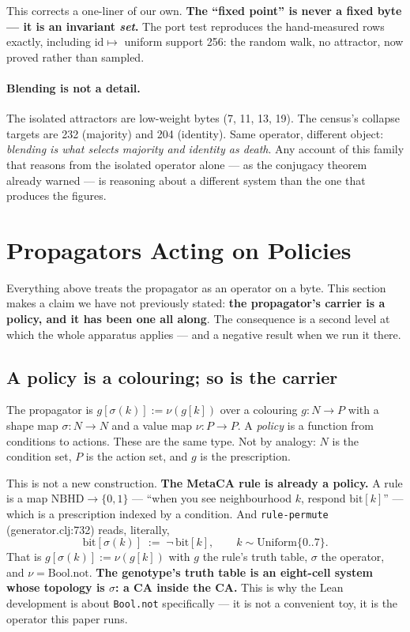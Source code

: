 \documentclass[man,12pt,floatsintext]{apa7}
\newcommand{\sig}{\sigma}
\newcommand{\bit}[1]{\mathrm{bit}[#1]}
\begin{document}
This corrects a one-liner of our own. \textbf{The ``fixed point'' is never
a fixed byte --- it is an invariant \emph{set}.} The port test reproduces
the hand-measured rows exactly, including $\mathrm{id} \mapsto$ uniform
support 256: the random walk, no attractor, now proved rather than
sampled.

\paragraph{Blending is not a detail.}
The isolated attractors are low-weight bytes (7, 11, 13, 19). The census's
collapse targets are 232 (majority) and 204 (identity). Same operator,
different object: \emph{blending is what selects majority and identity as
death}. Any account of this family that reasons from the isolated operator
alone --- as the conjugacy theorem already warned --- is reasoning about a
different system than the one that produces the figures.

\section{Propagators Acting on Policies}
\label{sec:policies}

Everything above treats the propagator as an operator on a byte. This section
makes a claim we have not previously stated: \textbf{the propagator's carrier is
a policy, and it has been one all along}. The consequence is a second level at
which the whole apparatus applies --- and a negative result when we run it there.

\subsection{A policy is a colouring; so is the carrier}

The propagator is $g[\sig(k)] := \nu(g[k])$ over a colouring $g : N \to P$ with a
shape map $\sig : N \to N$ and a value map $\nu : P \to P$. A \emph{policy} is a
function from conditions to actions. These are the same type. Not by analogy:
$N$ is the condition set, $P$ is the action set, and $g$ is the prescription.

This is not a new construction. \textbf{The MetaCA rule is already a policy.} A
rule is a map $\mathrm{NBHD} \to \{0,1\}$ --- ``when you see neighbourhood $k$,
respond $\bit{k}$'' --- which is a prescription indexed by a condition. And
\texttt{rule-permute} (generator.clj:732) reads, literally,
\[
  \bit{\sig(k)} \;:=\; \lnot\,\bit{k}, \qquad k \sim \mathrm{Uniform}\{0..7\}.
\]
That is $g[\sig(k)] := \nu(g[k])$ with $g$ the rule's truth table, $\sig$ the
operator, and $\nu = \mathrm{Bool.not}$. \textbf{The genotype's truth table is an
eight-cell system whose topology is $\sig$: a CA inside the CA.} This is why the
Lean development is about \texttt{Bool.not} specifically --- it is not a
convenient toy, it is the operator this paper runs.
\end{document}
